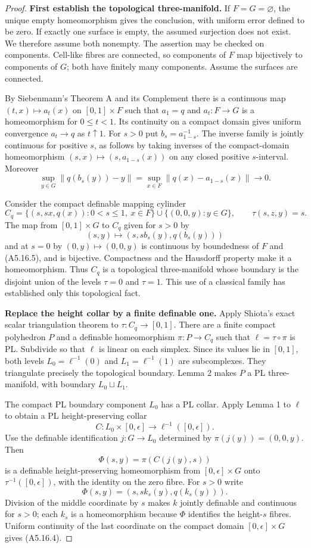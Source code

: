 \begin{proof}
\textbf{First establish the topological three-manifold.}
If $F=G=\varnothing$, the unique empty homeomorphism gives the conclusion,
with uniform error defined to be zero. If exactly one surface is empty,
the assumed surjection does not exist. We therefore assume both nonempty.
The assertion may be checked on components. Cell-like fibres are connected,
so components of $F$ map bijectively to components of $G$; both have finitely
many components. Assume the surfaces are connected.

By Siebenmann's Theorem A and its Complement there is a continuous map
$(t,x)\mapsto a_t(x)$ on $[0,1]\times F$ such that $a_1=q$ and
$a_t:F\to G$ is a homeomorphism for $0\le t<1$. Its continuity on a compact
domain gives uniform convergence $a_t\to q$ as $t\uparrow1$. For $s>0$ put
$b_s=a_{1-s}^{-1}$. The inverse family is jointly continuous for positive
$s$, as follows by taking inverses of the compact-domain homeomorphism
$(s,x)\mapsto(s,a_{1-s}(x))$ on any closed positive $s$-interval. Moreover
\[
 \sup_{y\in G}\|q(b_s(y))-y\|
 =\sup_{x\in F}\|q(x)-a_{1-s}(x)\|\longrightarrow0.
 \tag{A5.16.5}
\]

Consider the compact definable mapping cylinder
\[
 C_q=\{(s,sx,q(x)):0<s\le1,\ x\in F\}
       \cup\{(0,0,y):y\in G\},\qquad \tau(s,z,y)=s.
 \tag{A5.16.6}
\]
The map from $[0,1]\times G$ to $C_q$ given for $s>0$ by
\[
 (s,y)\longmapsto(s,sb_s(y),q(b_s(y)))
\]
and at $s=0$ by $(0,y)\mapsto(0,0,y)$ is continuous by boundedness of
$F$ and (A5.16.5), and is bijective. Compactness and the Hausdorff property
make it a homeomorphism. Thus $C_q$ is a topological three-manifold whose
boundary is the disjoint union of the levels $\tau=0$ and $\tau=1$.
This use of a classical family has established only this topological fact.

\medskip\noindent\textbf{Replace the height collar by a finite definable one.}
Apply Shiota's exact scalar triangulation theorem to
$\tau:C_q\to[0,1]$. There are a finite compact polyhedron $P$ and a
definable homeomorphism $\pi:P\to C_q$ such that $\ell=\tau\circ\pi$ is
PL. Subdivide so that $\ell$ is linear on each simplex. Since its values
lie in $[0,1]$, both levels $L_0=\ell^{-1}(0)$ and $L_1=\ell^{-1}(1)$
are subcomplexes. They triangulate precisely the topological boundary.
Lemma 2 makes $P$ a PL three-manifold, with boundary $L_0\sqcup L_1$.

The compact PL boundary component $L_0$ has a PL collar. Apply Lemma 1 to
$\ell$ to obtain a PL height-preserving collar
\[
 C:L_0\times[0,\epsilon]\longrightarrow\ell^{-1}([0,\epsilon]).
\]
Use the definable identification $j:G\to L_0$ determined by
$\pi(j(y))=(0,0,y)$. Then
\[
 \Phi(s,y)=\pi(C(j(y),s))
\]
is a definable height-preserving homeomorphism from $[0,\epsilon]\times G$
onto $\tau^{-1}([0,\epsilon])$, with the identity on the zero fibre.
For $s>0$ write
\[
 \Phi(s,y)=(s,s k_s(y),q(k_s(y))).
 \tag{A5.16.7}
\]
Division of the middle coordinate by $s$ makes $k$ jointly definable and
continuous for $s>0$; each $k_s$ is a homeomorphism because $\Phi$ identifies
the height-$s$ fibres. Uniform continuity of the last coordinate on the
compact domain $[0,\epsilon]\times G$ gives (A5.16.4).


\end{proof}
